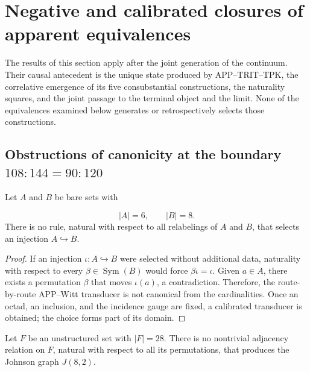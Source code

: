 
\section{Negative and calibrated closures of apparent equivalences}
\label{sec:hmt-final-clausuras-negativas-calibradas}

The results of this section apply after the joint generation of the
continuum. Their causal antecedent is the unique state produced by
APP--TRIT--TPK, the correlative emergence of its five consubstantial
constructions, the naturality squares, and the joint passage to the terminal
object and the limit. None of the equivalences examined below generates or
retrospectively selects those constructions.

\subsection{Obstructions of canonicity at the boundary
\texorpdfstring{\(108{:}144=90{:}120\)}{108:144=90:120}}

\begin{theorem}
\label{thm:hmt-final-no-inclusion-canonica-seis-ocho}
Let \(A\) and \(B\) be bare sets with

\[
 |A|=6,
 \qquad |B|=8.
\]
There is no rule, natural with respect to all relabelings of \(A\)
and \(B\), that selects an injection \(A\hookrightarrow B\).
\end{theorem}

\begin{proof}
If an injection \(\iota:A\hookrightarrow B\) were selected without additional
data, naturality with respect to every \(\beta\in\operatorname{Sym}(B)\)
would force \(\beta\iota=\iota\). Given \(a\in A\), there exists a permutation
\(\beta\) that moves \(\iota(a)\), a contradiction. Therefore, the route-by-route
APP--Witt transducer is not canonical from the cardinalities. Once
an octad, an inclusion, and the incidence gauge are fixed, a calibrated
transducer is obtained; the choice forms part of its domain.
\end{proof}

\begin{theorem}
\label{thm:hmt-final-no-johnson-desde-cardinal}
Let \(F\) be an unstructured set with \(|F|=28\). There is no nontrivial
adjacency relation on \(F\), natural with respect to all its
permutations, that produces the Johnson graph \(J(8,2)\).
\end{theorem}

